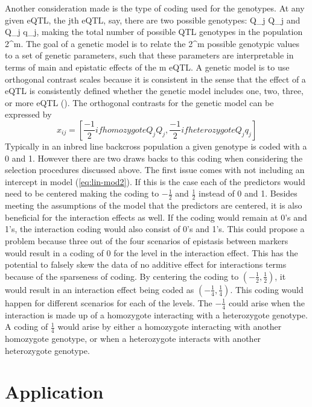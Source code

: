 \documentclass[11pt,]{book}
\theoremstyle{definition}
\theoremstyle{definition}
\theoremstyle{remark}
\begin{document}
Another consideration made is the type of coding used for the genotypes.
At any given eQTL, the jth eQTL, say, there are two possible genotypes:
Q\_j Q\_j and Q\_j q\_j, making the total number of possible QTL
genotypes in the population 2\^{}m. The goal of a genetic model is to
relate the 2\^{}m possible genotypic values to a set of genetic
parameters, such that these parameters are interpretable in terms of
main and epistatic effects of the m eQTL. A genetic model is to use
orthogonal contrast scales because it is consistent in the sense that
the effect of a eQTL is consistently defined whether the genetic model
includes one, two, three, or more eQTL (\cite{kao2002modeling}). The
orthogonal contrasts for the genetic model can be expressed by
\[x_{ij} = \left[\frac{-1}{2} if homozygote Q_j Q_j, \frac{-1}{2} if heterozygote Q_j q_j \right]\]
Typically in an inbred line backcross population a given genotype is
coded with a 0 and 1. However there are two draws backs to this coding
when considering the selection procedures discussed above. The first
issue comes with not including an intercept in model
(\eqref{eq:lin-mod2}). If this is the case each of the predictors would
need to be centered making the coding to \(-\frac{1}{2}\) and
\(\frac{1}{2}\) instead of 0 and 1. Besides meeting the assumptions of
the model that the predictors are centered, it is also beneficial for
the interaction effects as well. If the coding would remain at 0's and
1's, the interaction coding would also consist of 0's and 1's. This
could propose a problem because three out of the four scenarios of
epistasis between markers would result in a coding of 0 for the level in
the interaction effect. This has the potential to falsely skew the data
of no additive effect for interactions terms because of the sparseness
of coding. By centering the coding to \((-\frac{1}{2},\frac{1}{2})\), it
would result in an interaction effect being coded as
\((-\frac{1}{4},\frac{1}{4})\). This coding would happen for different
scenarios for each of the levels. The \(-\frac{1}{4}\) could arise when
the interaction is made up of a homozygote interacting with a
heterozygote genotype. A coding of \(\frac{1}{4}\) would arise by either
a homozygote interacting with another homozygote genotype, or when a
heterozygote interacts with another heterozygote genotype.

\section{Application}\label{application}
\end{document}
